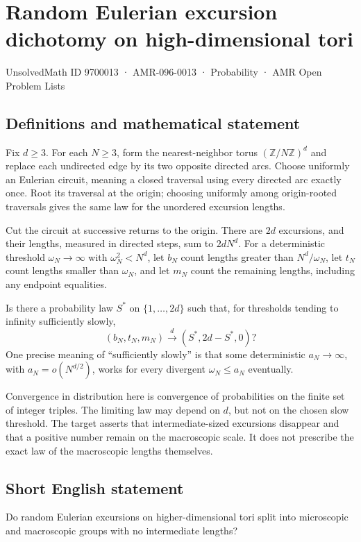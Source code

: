 \documentclass[11pt,a4paper]{article}
\begin{document}
\section*{Random Eulerian excursion dichotomy on high-dimensional tori}\label{9700013}
{\small UnsolvedMath ID 9700013 · AMR-096-0013 · Probability · AMR Open Problem Lists}
\subsection{Definitions and mathematical statement}
Fix $d\ge3$. For each $N\ge3$, form the nearest-neighbor torus $(\mathbb Z/N\mathbb Z)^d$ and replace each undirected edge by its two opposite directed arcs. Choose uniformly an Eulerian circuit, meaning a closed traversal using every directed arc exactly once. Root its traversal at the origin; choosing uniformly among origin-rooted traversals gives the same law for the unordered excursion lengths.

Cut the circuit at successive returns to the origin. There are $2d$ excursions, and their lengths, measured in directed steps, sum to $2dN^d$. For a deterministic threshold $\omega_N\to\infty$ with $\omega_N^2<N^d$, let $b_N$ count lengths greater than $N^d/\omega_N$, let $t_N$ count lengths smaller than $\omega_N$, and let $m_N$ count the remaining lengths, including any endpoint equalities.

Is there a probability law $S^*$ on $\{1,\ldots,2d\}$ such that, for thresholds tending to infinity sufficiently slowly,
\[
(b_N,t_N,m_N)\xrightarrow{d}(S^*,2d-S^*,0)?
\]
One precise meaning of ``sufficiently slowly'' is that some deterministic $a_N\to\infty$, with $a_N=o(N^{d/2})$, works for every divergent $\omega_N\le a_N$ eventually.

Convergence in distribution here is convergence of probabilities on the finite set of integer triples. The limiting law may depend on $d$, but not on the chosen slow threshold. The target asserts that intermediate-sized excursions disappear and that a positive number remain on the macroscopic scale. It does not prescribe the exact law of the macroscopic lengths themselves.
\subsection{Short English statement}
Do random Eulerian excursions on higher-dimensional tori split into microscopic and macroscopic groups with no intermediate lengths?
\end{document}
